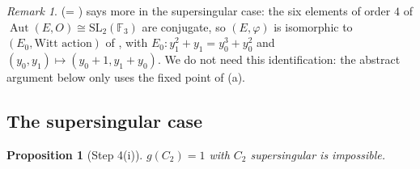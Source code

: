 \documentclass[11pt]{amsart}
\newtheorem{proposition}[theorem]{Proposition}
\theoremstyle{definition}
\theoremstyle{remark}
\newtheorem{remark}[theorem]{Remark}
\newcommand{\F}{\mathbb F}
\newcommand{\Aut}{\operatorname{Aut}}
\begin{document}
\begin{remark}
\cite[Lemma C.2]{A} (= \cite[Lemma 1.3]{ed2}) says more in the supersingular case: the
six elements of order $4$ of $\Aut(E,O)\cong\mathrm{SL}_2(\F_3)$ are conjugate, so
$(E,\varphi)$ is isomorphic to $(E_0,\text{Witt action})$ of \cite[Theorem 6.2]{P}, with
$E_0\colon y_1^2+y_1=y_0^3+y_0^2$ and $(y_0,y_1)\mapsto(y_0+1,y_1+y_0)$. We do not need
this identification: the abstract argument below only uses the fixed point of (a).
\end{remark}

\subsection{The supersingular case}

\begin{proposition}[Step 4(i)]\label{prop:step4i}
$g(C_2)=1$ with $C_2$ supersingular is impossible.
\end{proposition}
\end{document}
